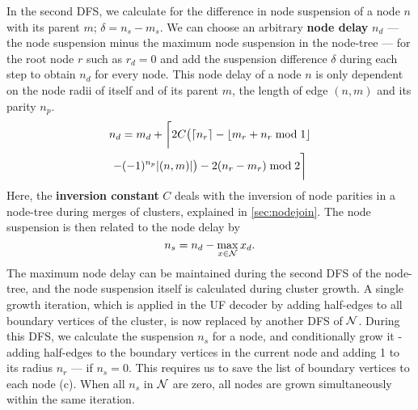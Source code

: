 In the second DFS, we calculate for the difference in node suspension of a node $n$ with its parent $m$; $\delta = n_s - m_s$. We can choose an arbitrary \textbf{node delay} $n_d$ --- the node suspension minus the maximum node suspension in the node-tree --- for the root node $r$ such as $r_d=0$ and add the suspension difference $\delta$ during each step to obtain $n_d$ for every node. This node delay of a node $n$ is only dependent on the node radii of itself and of its parent $m$, the length of edge $(n,m)$ and its parity $n_p$. 
\begin{multline}\label{eq:delayequation}
    n_d = m_d + \bigg \lceil 2C\big(\ceil{n_r} - \floor{m_r + n_r \bmod 1}\\
    - (-1)^{n_p}\abs{(n,m)}\big) - 2(n_r - m_r) \bmod2 \bigg \rceil
\end{multline}
Here, the \textbf{inversion constant} $C$ deals with the inversion of node parities in a node-tree during merges of clusters, explained in \ref{sec:nodejoin}. The node suspension is then related to the node delay by
\begin{equation*}
    n_s = n_d - \max_{x \in \mathcal{N}}{x_d}. 
\end{equation*}
The maximum node delay can be maintained during the second DFS of the node-tree, and the node suspension itself is calculated during cluster growth. A single growth iteration, which is applied in the UF decoder by adding half-edges to all boundary vertices of the cluster, is now replaced by another DFS of $\mathcal{N}$. During this DFS, we calculate the suspension $n_s$ for a node, and conditionally grow it - adding half-edges to the boundary vertices in the current node and adding 1 to its radius $n_r$ --- if $n_s = 0$. This requires us to save the list of boundary vertices to each node (c). When all $n_s$ in $\mathcal{N}$ are zero, all nodes are grown simultaneously within the same iteration. 

